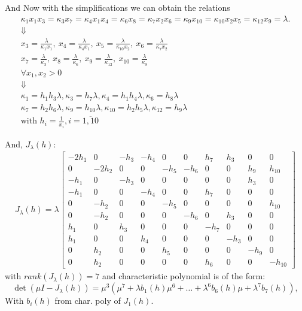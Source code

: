 \documentclass[aspectratio=169]{beamer}
\begin{document}
\begin{frame}
	And Now with the simplifications we can obtain the relations
	\begin{gather*}
		\kappa_1x_1x_3=\kappa_3x_7=\kappa_4x_1x_4=\kappa_6x_8=\kappa_7x_2x_6=\kappa_9x_{10}=\kappa_{10}x_2x_5=\kappa_{12}x_9=\lambda. \\
		\Downarrow \\
		x_{3} = \frac{\lambda}{\kappa_{1} x_{1}}, \ x_{4} = \frac{\lambda}{\kappa_{4} x_{1}}, \ x_{5} = \frac{\lambda}{\kappa_{10} x_{2}}, \ x_{6} = \frac{\lambda}{\kappa_{7} x_{2}} \\
		x_{7} = \frac{\lambda}{\kappa_{3}}, \ x_{8} = \frac{\lambda}{\kappa_{6}}, \ x_{9} = \frac{\lambda}{\kappa_{12}}, \ x_{10} = \frac{\lambda}{\kappa_{9}} \\
		\forall x_1, x_2 > 0 \\
		\Downarrow \\
		\kappa_{1} = h_{1} h_{3} \lambda, \kappa_{3} = h_{7} \lambda, \kappa_{4} = h_{1} h_{4} \lambda, \kappa_{6} = h_{8} \lambda \\
		\kappa_{7} = h_{2} h_{6} \lambda, \kappa_{9} = h_{10} \lambda, \kappa_{10} = h_{2} h_{5} \lambda, \kappa_{12} = h_{9} \lambda \\
		\text{with } h_i = \frac{1}{x_i} , i = \overline{1,10}
	\end{gather*}
\end{frame}

\begin{frame}
	And, $J_\lambda(h)$:
	\begin{align}
		J_\lambda(h) = \lambda
		\left.\left[
			\begin{array}{rrrrrrrrrr}-2h_{1}&0&-h_{3}&-h_{4}&0&0&h_{7}&h_{3}&0&0\\0&-2h_{2}&0&0&-h_{5}&-h_{6}&0&0&h_{9}&h_{10}\\-h_{1}&0&-h_{3}&0&0&0&0&0&h_{3}&0\\-h_{1}&0&0&-h_{4}&0&0&h_{7}&0&0&0\\0&-h_{2}&0&0&-h_{5}&0&0&0&0&h_{10}\\0&-h_{2}&0&0&0&-h_{6}&0&h_{3}&0&0\\h_{1}&0&h_{3}&0&0&0&-h_{7}&0&0&0\\h_{1}&0&0&h_{4}&0&0&0&-h_{3}&0&0\\0&h_{2}&0&0&h_{5}&0&0&0&-h_{9}&0\\0&h_{2}&0&0&0&0&h_{6}&0&0&-h_{10}
		\end{array}\right.\right]
	\end{align}
	with $rank(J_\lambda(h)) = 7$ and characteristic polynomial is of the form:
	\[
		\det\left(\mu I-J_\lambda(h)\right)=\mu^3\left(\mu^7+\lambda b_1(h)\mu^6+\ldots+\lambda^6b_6(h)\mu+\lambda^7b_7(h)\right),
	\]
	With $b_i(h)$ from char. poly of $J_1(h)$.
\end{frame}
\end{document}
